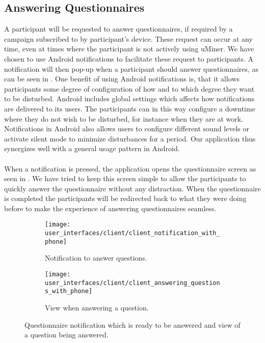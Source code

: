 \subsection{Answering Questionnaires}
\label{sub:answering_questionnaired}
A participant will be requested to answer questionnaires, if required by a campaign subscribed to by participant's device. These request can occur at any time, even at times where the participant is not actively using uMiner. We have chosen to use Android notifications \parencite{android_notifications} to facilitate these request to participants. A notification will then pop-up when a participant should answer questionnaires, as can be seen in . One benefit of using Android notifications is, that it allows participants some degree of configuration of how and to which degree they want to be disturbed. Android includes global settings which affects how notifications are delivered to its users. The participants can in this way configure a downtime where they do not wish to be disturbed, for instance when they are at work. Notifications in Android also allows users to configure different sound levels or activate silent mode to minimize disturbances for a period. Our application thus synergizes well with a general usage pattern in Android.     
\\\\
When a notification is pressed, the application opens the questionnaire screen as seen in . We have tried to keep this screen simple to allow the participants to quickly answer the questionnaire without any distraction. When the questionnaire is completed the participants will be redirected back to what they were doing before to make the experience of answering questionnaires seamless. 
\begin{figure}[!htbp]
    \begin{subfigure}[!t]{.50\textwidth}
        \centering
        \texttt{[image: user\_interfaces/client/client\_notification\_with\_phone]}
        \caption{Notification to answer questions.}
        \label{fig:answering_questionnaire_notification}
    \end{subfigure}%
    \begin{subfigure}[!t]{.50\textwidth}
        \centering
        \texttt{[image: user\_interfaces/client/client\_answering\_questions\_with\_phone]}
        \caption{View when answering a question.}
        \label{fig:answering_questionnaire_answering}
    \end{subfigure}
    \caption{Questionnaire notification which is ready to be answered and view of a question being answered.}
    \label{fig:answering_questionnaire}
\end{figure}
\FloatBarrier

